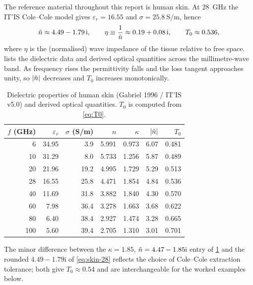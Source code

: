 The reference material throughout this report is human skin. At
\SI{28}{\giga\hertz} the IT'IS Cole--Cole model gives $\varepsilon_r=16.55$ and
$\sigma=\SI{25.8}{\siemens\per\metre}$, hence
\begin{equation}\label{eq:skin-28}
  \tilde{n} \approx 4.49 - 1.79\,\mathrm{i},
  \qquad
  \eta \equiv \frac{1}{\tilde{n}} \approx 0.19 + 0.08\,\mathrm{i},
  \qquad
  T_0 \approx 0.536,
\end{equation}
where $\eta$ is the (normalised) wave impedance of the tissue relative to free
space.  lists the dielectric data and derived optical
quantities across the millimetre-wave band. As frequency rises the permittivity
falls and the loss tangent approaches unity, so $\abs{\tilde{n}}$ decreases and
$T_0$ increases monotonically.

\begin{table}[!htbp]
\centering
\caption{Dielectric properties of human skin (Gabriel 1996 / IT'IS v5.0) and
  derived optical quantities. $T_0$ is computed from \cref{eq:T0}.}
\label{tab:skin-band}
\begin{tabular}{rrrrrrr}
\toprule
$f$ (GHz) & $\varepsilon_r$ & $\sigma$ (S/m) & $n$ & $\kappa$ & $\abs{\tilde{n}}$ & $T_0$ \\
\midrule
6   & 34.95 & \phantom{0}3.9 & 5.991 & 0.973 & 6.07 & 0.481 \\
10  & 31.29 & \phantom{0}8.0 & 5.733 & 1.256 & 5.87 & 0.489 \\
20  & 21.96 &           19.2 & 4.995 & 1.729 & 5.29 & 0.513 \\
28  & 16.55 &           25.8 & 4.471 & 1.854 & 4.84 & 0.536 \\
40  & 11.69 &           31.8 & 3.882 & 1.840 & 4.30 & 0.570 \\
60  & \phantom{0}7.98 & 36.4 & 3.278 & 1.663 & 3.68 & 0.622 \\
80  & \phantom{0}6.40 & 38.4 & 2.927 & 1.474 & 3.28 & 0.665 \\
100 & \phantom{0}5.60 & 39.4 & 2.705 & 1.310 & 3.01 & 0.701 \\
\bottomrule
\end{tabular}
\end{table}

The minor difference between the $\kappa=1.85$, $\tilde{n}=4.47-1.85\mathrm{i}$
entry of \cref{tab:skin-band} and the rounded $4.49-1.79\mathrm{i}$ of
\cref{eq:skin-28} reflects the choice of Cole--Cole extraction tolerance; both
give $T_0\approx0.54$ and are interchangeable for the worked examples below.
